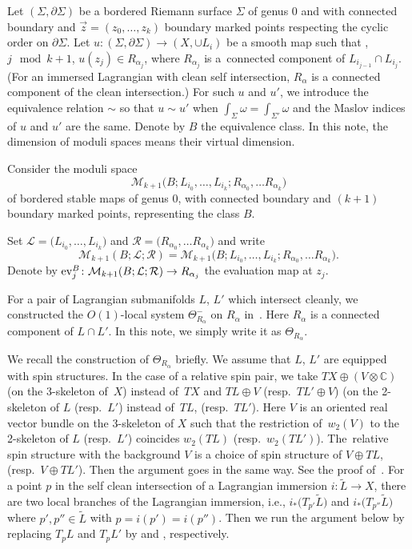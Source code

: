 \documentclass[pdftex]{sigma}
\numberwithin{equation}{section}
\theoremstyle{definition}
\newcommand{\arc}[1]{%
 \settowidth{\dimen0}{\ensuremath{#1}}%
 \divide\dimen0 by 2%
 \overset{\rotatebox{-90}{\ensuremath{\left(\rule{0pt}{\dimen0}\right.}}}{#1}%
}
\begin{document}
Let $(\Sigma, \partial \Sigma)$ be a bordered Riemann surface $\Sigma$ of genus $0$ and with connected boundary
and $\vec{z}=(z_0, \dots, z_k)$ boundary marked points respecting the cyclic order on $\partial \Sigma$.
Let $u\colon (\Sigma, \partial \Sigma) \to (X, \cup L_i)$ be a smooth map such that \smash{$u\bigl(\arc{z_j z_{j+1}}\bigr) \subset L_{i_j}$}, $j \mod k+1$, $u(z_j) \in R_{\alpha_j}$, where
$R_{\alpha_j}$ is a~connected component of $L_{i_{j-1}} \cap L_{i_j}$.
(For an immersed Lagrangian with clean self intersection, $R_{\alpha}$ is a connected component of the clean intersection.)
For such $u$ and $u'$, we introduce the equivalence relation $\sim$ so that $u \sim u'$ when $\int_{\Sigma} \omega = \int_{\Sigma'} \omega$ and the Maslov indices of $u$ and $u'$
are the same. Denote by $B$ the equivalence class.
In this note, the dimension of moduli spaces means their virtual dimension.

Consider the moduli space
\[{\mathcal M}_{k+1}\bigl(B;L_{i_0}, \dots, L_{i_k}; R_{\alpha_0}, \dots R_{\alpha_k}\bigr)\]
of bordered stable maps of genus 0, with connected boundary and $(k+1)$ boundary marked points, representing the class $B$.

Set ${\mathcal L}=\bigl(L_{i_0}, \dots, L_{i_k}\bigr)$ and ${\mathcal R}=\bigl(R_{\alpha_0}, \dots R_{\alpha_k}\bigr)$ and write
\[
{\mathcal M}_{k+1}(B;{\mathcal L};{\mathcal R})={\mathcal M}_{k+1}\bigl(B;L_{i_0}, \dots, L_{i_k}; R_{\alpha_0}, \dots R_{\alpha_k}\bigr).
\]
Denote by ${\rm ev}_j^B\colon {\mathcal M}_{k+1}(B;{\mathcal L}; {\mathcal R}) \to R_{\alpha_j}$ the evaluation map at $z_j$.

For a pair of Lagrangian submanifolds $L$, $L'$ which intersect cleanly, we constructed
the $O(1)$-local system $\Theta^-_{R_\alpha}$ on $R_{\alpha}$ in~\cite[Proposition 8.1.1]{FOOO09II}.
Here $R_{\alpha}$ is a connected component of $L \cap L'$.
In this note, we simply write it as $\Theta_{R_{\alpha}}$.


We recall the construction of $\Theta_{R_{\alpha}}$ briefly. We assume that $L$, $L'$ are equipped with spin structures. In the case of a relative spin pair, we take
$TX \oplus (V \otimes {\mathbb C})$ (on the 3-skeleton of~$X$) instead of~$TX$ and $TL \oplus V$ (resp.\ $TL' \oplus V$) (on the 2-skeleton of $L$ (resp.\ $L'$)
instead of~$TL$, (resp.~$TL'$).
Here $V$ is an oriented real vector bundle on the 3-skeleton of $X$ such that the restriction of~$w_2(V)$ to the 2-skeleton of $L$ (resp.\ $L'$) coincides
$w_2(TL)$ (resp.\ $w_2(TL')$).
The~relative spin structure with the background $V$ is a choice of spin structure of $V \oplus TL$, (resp.\ $V \oplus TL'$).
Then the argument goes in the same way.
See the proof of~\cite[Theorem 8.1.1]{FOOO09II}.
For a point $p$ in the self clean intersection of a Lagrangian immersion $i\colon \widetilde{L} \to X$, there are two local branches of the Lagrangian immersion,
i.e., $i_*\bigl(T_{p'}\widetilde{L}\bigr)$ and $i_*\bigl(T_{p''}\widetilde{L}\bigr)$ where $p', p'' \in \widetilde{L}$ with $p=i(p')=i(p'')$.
Then we run the argument below by replacing $T_p L$ and $T_p L'$ by  and , respectively.
\end{document}
